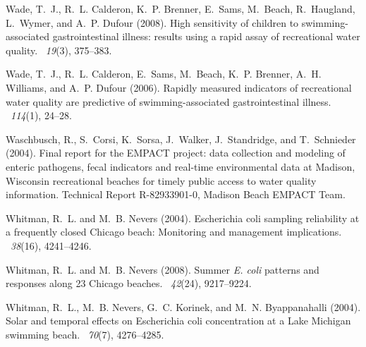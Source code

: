 \documentclass[authoryear,review, 12pt]{elsarticle}
\begin{document}
\begin{thebibliography}{}
Wade, T.~J., R.~L. Calderon, K.~P. Brenner, E.~Sams, M.~Beach, R.~Haugland,
  L.~Wymer, and A.~P. Dufour (2008).
\newblock High sensitivity of children to swimming-associated gastrointestinal
  illness: results using a rapid assay of recreational water quality.
~{\em 19\/}(3), 375--383.

Wade, T.~J., R.~L. Calderon, E.~Sams, M.~Beach, K.~P. Brenner, A.~H. Williams,
  and A.~P. Dufour (2006).
\newblock Rapidly measured indicators of recreational water quality are
  predictive of swimming-associated gastrointestinal illness.
~{\em 114\/}(1), 24--28.

Waschbusch, R., S.~Corsi, K.~Sorsa, J.~Walker, J.~Standridge, and T.~Schnieder
  (2004).
\newblock Final report for the {EMPACT} project: data collection and modeling
  of enteric pathogens, fecal indicators and real-time environmental data at
  {Madison, Wisconsin} recreational beaches for timely public access to water
  quality information.
\newblock Technical Report R-82933901-0, Madison Beach EMPACT Team.

Whitman, R.~L. and M.~B. Nevers (2004).
\newblock Escherichia coli sampling reliability at a frequently closed {C}hicago
  beach: Monitoring and management implications.
~{\em 38\/}(16),
  4241--4246.

Whitman, R.~L. and M.~B. Nevers (2008).
\newblock Summer \emph{{E}. coli} patterns and responses along 23 {C}hicago beaches.
~{\em 42\/}(24),
  9217--9224.

Whitman, R.~L., M.~B. Nevers, G.~C. Korinek, and M.~N. Byappanahalli (2004).
\newblock Solar and temporal effects on {E}scherichia coli concentration at a
  {Lake Michigan} swimming beach.
~{\em 70\/}(7),
  4276--4285.


\end{thebibliography}
\end{document}
